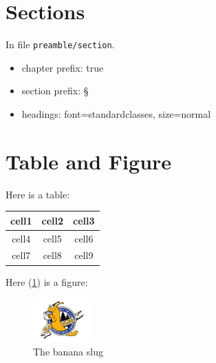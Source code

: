 \documentclass[%
	12pt, %
]{scrbook} %
\begin{document}
\section{Sections}
In file \texttt{preamble/section}.
\begin{itemize}
	\item chapter prefix: true 
	\item section prefix: \S
	\item headings: font=standardclasses, size=normal
\end{itemize}
\section{Table and Figure}
Here is a table:
\begin{center}
	\begin{tabular}{ c | c c }
		cell1 & cell2 & cell3 \\ 
		\hline
		cell4 & cell5 & cell6 \\  
		cell7 & cell8 & cell9    
	 \end{tabular}
\end{center}
Here (\cref{fig:logo}) is a figure:
\begin{figure}[h!]
	\centering
  \includegraphics[width=0.2\textwidth]{images/UCSC-logo.png}
  \caption{The banana slug}
  \label{fig:logo}
\end{figure}
\clearpage
\end{document}
